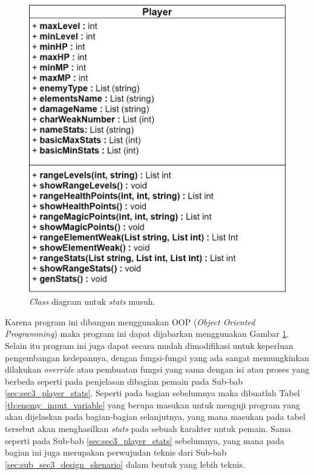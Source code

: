 \begin{figure} [!h] \centering
	\includegraphics[scale=0.25]{img/enemy_uml.png}
	\caption{\textit{Class} diagram untuk \textit{stats} musuh.}
	\label{fig:enemy_uml}
\end{figure}

Karena program ini dibangun menggunakan OOP (\textit{Object Oriented Programming}) maka program ini dapat dijabarkan menggunakan Gambar \ref{fig:enemy_uml}. Selain itu program ini juga dapat secara mudah dimodifikasi untuk keperluan pengembangan kedepannya, dengan fungsi-fungsi yang ada sangat memungkinkan dilakukan \textit{override} atau pembuatan fungsi yang sama dengan isi atau proses yang berbeda seperti pada penjelasan dibagian pemain pada Sub-bab \ref{sec:sec3_player_stats}. Seperti pada bagian sebelumnya maka dibuatlah Tabel \ref{tb:enemy_input_variable} yang berupa masukan untuk menguji program yang akan dijelaskan pada bagian-bagian selanjutnya, yang mana masukan pada tabel tersebut akan menghasilkan \textit{stats} pada sebuah karakter untuk pemain. Sama seperti pada Sub-bab \ref{sec:sec3_player_stats} sebelumnya, yang mana pada bagian ini juga merupakan perwujudan teknis dari Sub-bab \ref{sec:sub_sec3_design_skenario} dalam bentuk yang lebih teknis.
\vspace{-1ex}

